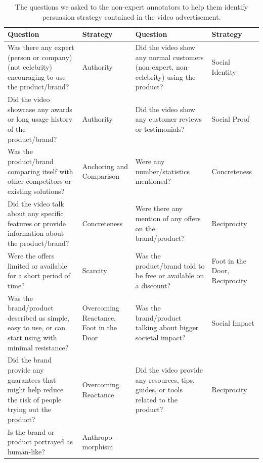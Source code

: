 \documentclass[hidelinks,11pt,a4paper]{report}
\begin{document}
\begin{table}[!hp]
  \centering
  \begin{tabular}{|p{3.5cm}|p{2.3cm}|p{3.5cm}|p{2.3cm}|}
    \hline
    \textbf{Question} & \textbf{Strategy} & \textbf{Question} & \textbf{Strategy} \\
    \hline
    Was there any expert (person or company) (not celebrity) encouraging to use the product/brand? & Authority & Did the video show any normal customers (non-expert, non-celebrity) using the product? & Social Identity \\
    \hline
    Did the video showcase any awards or long usage history of the product/brand? & Authority & Did the video show any customer reviews or testimonials? & Social Proof \\
    \hline
    Was the product/brand comparing itself with other competitors or existing solutions? & Anchoring and Comparison & Were any number/statistics mentioned? & Concreteness \\
    \hline
    Did the video talk about any specific features or provide information about the product/brand? & Concreteness & Were there any mention of any offers on the brand/product? & Reciprocity \\
    \hline
    Were the offers limited or available for a short period of time? & Scarcity & Was the product/brand told to be free or available on a discount? & Foot in the Door, Reciprocity \\
    \hline
    Was the brand/product described as simple, easy to use, or can start using with minimal resistance? & Overcoming Reactance, Foot in the Door & Was the brand/product talking about bigger societal impact? & Social Impact \\
    \hline
    Did the brand provide any guarantees that might help reduce the risk of people trying out the product? & Overcoming Reactance & Did the video provide any resources, tips, guides, or tools related to the product? & Reciprocity \\
    \hline
    Is the brand or product portrayed as human-like? & \makecell{Anthropo-\\morphism} & & \\
    \hline
  \end{tabular}
  \caption{The questions we asked to the non-expert annotators to help them identify persuasion strategy contained in the video advertisement. \label{table:persuasion strategy questions}}
\end{table}
\end{document}
